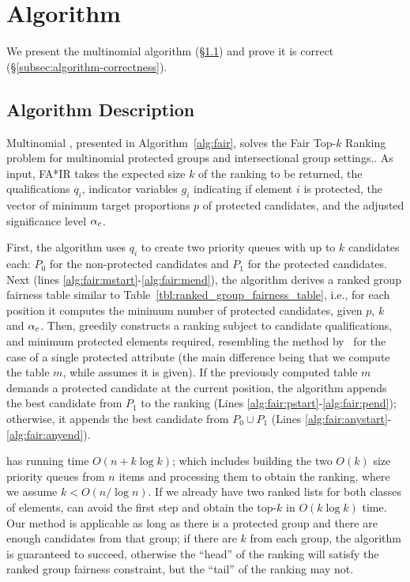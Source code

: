 \section{Algorithm}\label{sec:algorithms}
We present the multinomial \algoFAIR algorithm (\S\ref{subsec:algorithm-description}) and prove it is correct (\S\ref{subsec:algorithm-correctness}).

\subsection{Algorithm Description}\label{subsec:algorithm-description}

Multinomial \algoFAIR, presented in Algorithm~\ref{alg:fair}, solves the {\sc Fair Top-$k$ Ranking} problem for multinomial protected groups and intersectional group settings..
%
As input, FA*IR takes 
the expected size $k$ of the ranking to be returned,
the qualifications $q_i$, 
indicator variables $g_i$ indicating if element $i$ is protected,
the vector of minimum target proportions $p$ of protected candidates, and
the adjusted significance level $\alpha_c$.

First, the algorithm uses $q_i$ to create two priority queues with up to $k$ candidates each: $P_0$ for the non-protected candidates and $P_1$ for the protected candidates.
%
Next (lines \ref{alg:fair:mstart}-\ref{alg:fair:mend}), the algorithm derives a ranked group fairness table similar to Table~\ref{tbl:ranked_group_fairness_table}, i.e., for each position it computes the minimum number of protected candidates, given $p$, $k$ and $\alpha_c$.
%
Then, \algoFAIR greedily constructs a ranking subject to candidate qualifications, and minimum protected elements required, resembling the method by~\citet{celis2017ranking} for the case of a single protected attribute (the main difference being that we compute the table $m$, while \cite{celis2017ranking} assumes it is given).
%
If the previously computed table $m$ demands a protected candidate at the current position, the algorithm appends the best candidate from $P_1$ to the ranking (Lines \ref{alg:fair:pstart}-\ref{alg:fair:pend}); otherwise, it appends the best candidate from $P_0 \cup P_1$ (Lines \ref{alg:fair:anystart}-\ref{alg:fair:anyend}).

\algoFAIR has running time $O(n + k \log k)$; which includes building the two $O(k)$ size priority queues from $n$ items and processing them to obtain the ranking, where we assume $k < O(n/\log n)$. 
%
If we already have two ranked lists for both classes of elements, \algoFAIR can avoid the first step and obtain the top-$k$ in $O(k \log k)$ time.
%
Our method is applicable as long as there is a protected group and there are enough candidates from that group; if there are $k$ from each group, the algorithm is guaranteed to succeed, otherwise the ``head'' of the ranking will satisfy the ranked group fairness constraint, but the ``tail'' of the ranking may not.

